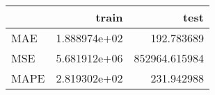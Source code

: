 \begin{tabular}{lrr}
\toprule
{} &         train &           test \\
\midrule
MAE  &  1.888974e+02 &     192.783689 \\
MSE  &  5.681912e+06 &  852964.615984 \\
MAPE &  2.819302e+02 &     231.942988 \\
\bottomrule
\end{tabular}
